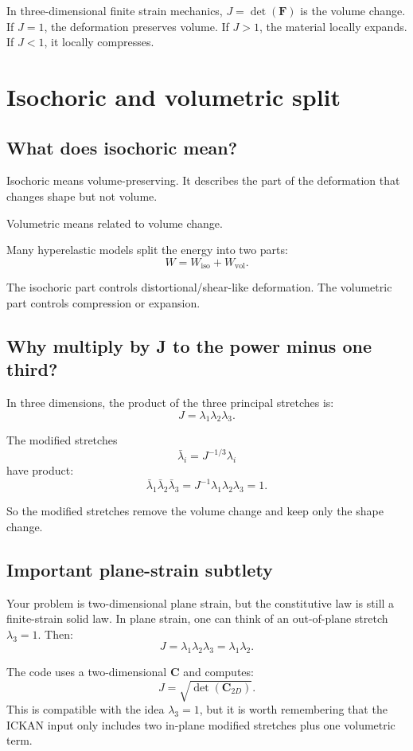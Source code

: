\documentclass[11pt]{article}
\newcommand{\F}{\bm{F}}
\newcommand{\C}{\bm{C}}
\begin{document}
In three-dimensional finite strain mechanics, $J=\det(\F)$ is the volume change.
If $J=1$, the deformation preserves volume. If $J>1$, the material locally
expands. If $J<1$, it locally compresses.

\section{Isochoric and volumetric split}

\subsection{What does isochoric mean?}

Isochoric means volume-preserving. It describes the part of the deformation that
changes shape but not volume.

Volumetric means related to volume change.

Many hyperelastic models split the energy into two parts:
\[
  W = W_{\mathrm{iso}} + W_{\mathrm{vol}}.
\]

The isochoric part controls distortional/shear-like deformation. The volumetric
part controls compression or expansion.

\subsection{Why multiply by J to the power minus one third?}

In three dimensions, the product of the three principal stretches is:
\[
  J = \lambda_1\lambda_2\lambda_3.
\]

The modified stretches
\[
  \bar{\lambda}_i = J^{-1/3}\lambda_i
\]
have product:
\[
  \bar{\lambda}_1\bar{\lambda}_2\bar{\lambda}_3
  =
  J^{-1}\lambda_1\lambda_2\lambda_3
  =
  1.
\]

So the modified stretches remove the volume change and keep only the shape
change.

\subsection{Important plane-strain subtlety}

Your problem is two-dimensional plane strain, but the constitutive law is still
a finite-strain solid law. In plane strain, one can think of an out-of-plane
stretch $\lambda_3=1$. Then:
\[
  J = \lambda_1\lambda_2\lambda_3
  =
  \lambda_1\lambda_2.
\]

The code uses a two-dimensional $\C$ and computes:
\[
  J = \sqrt{\det(\C_{2D})}.
\]
This is compatible with the idea $\lambda_3=1$, but it is worth remembering that
the ICKAN input only includes two in-plane modified stretches plus one
volumetric term.
\end{document}
